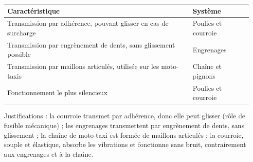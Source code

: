 \documentclass[11pt]{article}
\begin{document}
\begin{corrige}
\begin{center}
\begin{tabularx}{\linewidth}{|X|l|}
\hline
\rowcolor{popblueL} \textbf{Caractéristique} & \textbf{Système} \\
\hline
Transmission par adhérence, pouvant glisser en cas de surcharge & Poulies et courroie \\
\hline
Transmission par engrènement de dents, sans glissement possible & Engrenages \\
\hline
Transmission par maillons articulés, utilisée sur les moto-taxis & Chaîne et pignons \\
\hline
Fonctionnement le plus silencieux & Poulies et courroie \\
\hline
\end{tabularx}
\end{center}
Justifications : la courroie transmet par adhérence, donc elle peut glisser (rôle de fusible mécanique) ; les engrenages transmettent par engrènement de dents, sans glissement ; la chaîne de moto-taxi est formée de maillons articulés ; la courroie, souple et élastique, absorbe les vibrations et fonctionne sans bruit, contrairement aux engrenages et à la chaîne.
\end{corrige}
\end{document}
